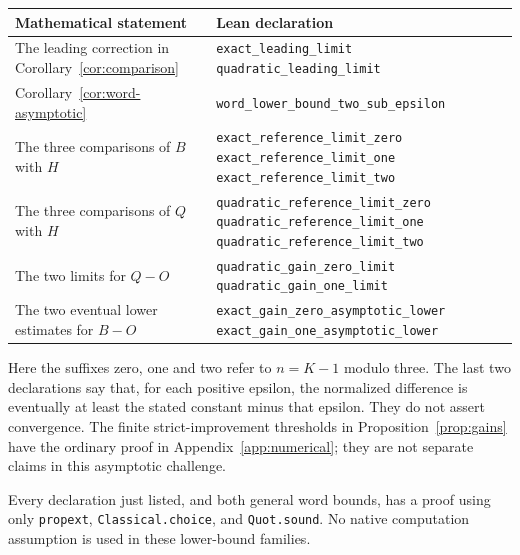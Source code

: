 \begin{center}
\small
\begin{tabular}{@{}>{\raggedright\arraybackslash}p{}
                  >{\raggedright\arraybackslash}p{}@{}}
\toprule
Mathematical statement & Lean declaration\\
\midrule
The leading correction in Corollary~\ref{cor:comparison}
& \nolinkurl{exact_leading_limit}\newline
  \nolinkurl{quadratic_leading_limit}\\[3pt]
Corollary~\ref{cor:word-asymptotic}
& \nolinkurl{word_lower_bound_two_sub_epsilon}\\[3pt]
The three comparisons of $B$ with $H$
& \nolinkurl{exact_reference_limit_zero}\newline
  \nolinkurl{exact_reference_limit_one}\newline
  \nolinkurl{exact_reference_limit_two}\\[3pt]
The three comparisons of $Q$ with $H$
& \nolinkurl{quadratic_reference_limit_zero}\newline
  \nolinkurl{quadratic_reference_limit_one}\newline
  \nolinkurl{quadratic_reference_limit_two}\\[3pt]
The two limits for $Q-O$
& \nolinkurl{quadratic_gain_zero_limit}\newline
  \nolinkurl{quadratic_gain_one_limit}\\[3pt]
The two eventual lower estimates for $B-O$
& \nolinkurl{exact_gain_zero_asymptotic_lower}\newline
  \nolinkurl{exact_gain_one_asymptotic_lower}\\
\bottomrule
\end{tabular}
\end{center}

Here the suffixes zero, one and two refer to $n=K-1$ modulo three.
The last two declarations say that, for each positive epsilon, the
normalized difference is eventually at least the stated constant minus
that epsilon. They do not assert convergence. The finite strict-improvement
thresholds in Proposition~\ref{prop:gains} have the ordinary proof in
Appendix~\ref{app:numerical}; they are not separate claims in this
asymptotic challenge.

Every declaration just listed, and both general word bounds, has a proof
using only \nolinkurl{propext}, \nolinkurl{Classical.choice}, and
\nolinkurl{Quot.sound}. No native computation assumption is used in these
lower-bound families.
